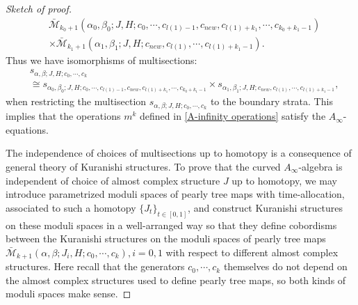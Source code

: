 \documentclass{amsart}
\numberwithin{equation}{section}
\numberwithin{figure}{section}
\begin{document}
\begin{proof}[Sketch of proof]
\begin{equation}
\begin{split}
&\bar{\mathcal{M}}_{k_{0}+1}(\alpha_{0}, \beta_{0}; J, H; c_{0}, \cdots, c_{l(1)-1}, c_{new}, c_{l(1) + k_{1}}, \cdots, c_{k_{0} + k_{1} -1})\\
&\times \bar{\mathcal{M}}_{k_{1}+1}(\alpha_{1}, \beta_{1}; J, H; c_{new}, c_{l(1)}, \cdots, c_{l(1) + k_{1} - 1}).
\end{split}
\end{equation}
Thus we have isomorphisms of multisections:
\begin{equation}
\begin{split}
&s_{\alpha, \beta; J, H; c_{0}, \cdots, c_{k}}\\
&\cong s_{\alpha_{0}, \beta_{0}; J, H; c_{0}, \cdots, c_{l(1)-1}, c_{new}, c_{l(1) + k_{1}}, \cdots, c_{k_{0} + k_{1} -1}} \times s_{\alpha_{1}, \beta_{1}; J, H; c_{new}, c_{l(1)}, \cdots, c_{l(1) + k_{1} - 1}},
\end{split}
\end{equation}
when restricting the multisection $s_{\alpha, \beta; J, H; c_{0}, \cdots, c_{k}}$ to the boundary strata. This implies that the operations $m^{k}$ defined in \eqref{A-infinity operations} satisfy the $A_{\infty}$-equations. \par
	The independence of choices of multisections up to homotopy is a consequence of general theory of Kuranishi structures. To prove that the curved $A_{\infty}$-algebra is independent of choice of almost complex structure $J$ up to homotopy, we may introduce parametrized moduli spaces of pearly tree maps with time-allocation, associated to such a homotopy $\{J_{t}\}_{t \in [0, 1]}$, and construct Kuranishi structures on these moduli spaces in a well-arranged way so that they define cobordisms between the Kuranishi structures on the moduli spaces of pearly tree maps $\bar{\mathcal{M}}_{k+1}(\alpha, \beta; J_{i}, H; c_{0}, \cdots, c_{k}), i = 0, 1$ with respect to different almost complex structures. Here recall that the generators $c_{0}, \cdots, c_{k}$ themselves do not depend on the almost complex structures used to define pearly tree maps, so both kinds of moduli spaces make sense. \par
\end{proof}
\end{document}
